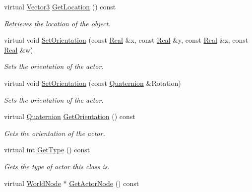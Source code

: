 \begin{DoxyCompactItemize}
virtual \hyperlink{classphys_1_1Vector3}{Vector3} \hyperlink{classphys_1_1ActorBase_a777b4ea4d6881af76c646b1ba9324d96}{GetLocation} () const 
\begin{DoxyCompactList}\small\item\em Retrieves the location of the object. \item\end{DoxyCompactList}\item 
virtual void \hyperlink{classphys_1_1ActorBase_a70c912b72a90d055aea450f18dbac3de}{SetOrientation} (const \hyperlink{namespacephys_af7eb897198d265b8e868f45240230d5f}{Real} \&x, const \hyperlink{namespacephys_af7eb897198d265b8e868f45240230d5f}{Real} \&y, const \hyperlink{namespacephys_af7eb897198d265b8e868f45240230d5f}{Real} \&z, const \hyperlink{namespacephys_af7eb897198d265b8e868f45240230d5f}{Real} \&w)
\begin{DoxyCompactList}\small\item\em Sets the orientation of the actor. \item\end{DoxyCompactList}\item 
virtual void \hyperlink{classphys_1_1ActorBase_a17db5c39d6edd56fd062d9e50af2d9b0}{SetOrientation} (const \hyperlink{classphys_1_1Quaternion}{Quaternion} \&Rotation)
\begin{DoxyCompactList}\small\item\em Sets the orientation of the actor. \item\end{DoxyCompactList}\item 
virtual \hyperlink{classphys_1_1Quaternion}{Quaternion} \hyperlink{classphys_1_1ActorBase_ad5e1df2fd1fcd6b795e499c6e39bd336}{GetOrientation} () const 
\begin{DoxyCompactList}\small\item\em Gets the orientation of the actor. \item\end{DoxyCompactList}\item 
virtual int \hyperlink{classphys_1_1ActorBase_ac631b0572fbcac6ac6dee3b0a8704c8e}{GetType} () const 
\begin{DoxyCompactList}\small\item\em Gets the type of actor this class is. \item\end{DoxyCompactList}\item 
virtual \hyperlink{classphys_1_1WorldNode}{WorldNode} $\ast$ \hyperlink{classphys_1_1ActorBase_a1718f316f4e20eb97654a2d77581588a}{GetActorNode} () const 

\end{DoxyCompactItemize}
